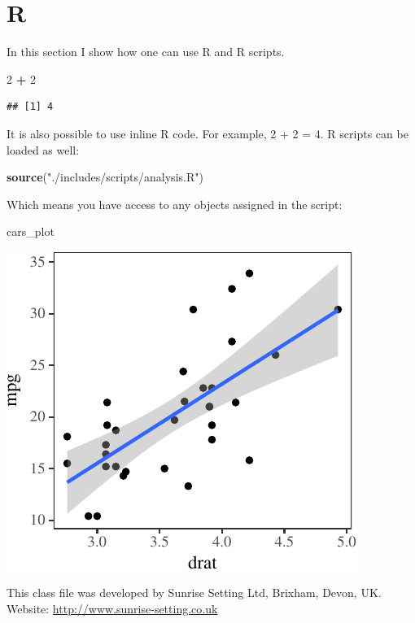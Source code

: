 \documentclass[Afour,sageh,times]{includes/tex/sagej}
\newenvironment{Shaded}{\begin{snugshade}}{\end{snugshade}}
\newcommand{\KeywordTok}[1]{\textcolor[rgb]{0.13,0.29,0.53}{\textbf{#1}}}
\newcommand{\DecValTok}[1]{\textcolor[rgb]{0.00,0.00,0.81}{#1}}
\newcommand{\StringTok}[1]{\textcolor[rgb]{0.31,0.60,0.02}{#1}}
\newcommand{\OperatorTok}[1]{\textcolor[rgb]{0.81,0.36,0.00}{\textbf{#1}}}
\newcommand{\NormalTok}[1]{#1}
\begin{document}
\section{R}

In this section I show how one can use R and R scripts.

\begin{Shaded}
\begin{Highlighting}[]
\DecValTok{2} \OperatorTok{+}\StringTok{ }\DecValTok{2}
\end{Highlighting}
\end{Shaded}

\begin{verbatim}
## [1] 4
\end{verbatim}

\noindent It is also possible to use inline R code. For example, 2 + 2 =
4. R scripts can be loaded as well:

\begin{Shaded}
\begin{Highlighting}[]
\KeywordTok{source}\NormalTok{(}\StringTok{"./includes/scripts/analysis.R"}\NormalTok{)}
\end{Highlighting}
\end{Shaded}

\noindent Which means you have access to any objects assigned in the
script:

\begin{Shaded}
\begin{Highlighting}[]
\NormalTok{cars_plot}
\end{Highlighting}
\end{Shaded}

\begin{flushleft}\includegraphics{./includes/figs/ex_plot-1} \end{flushleft}

\begin{acks}
This class file was developed by Sunrise Setting Ltd, Brixham, Devon, UK. \\
Website: \url{http://www.sunrise-setting.co.uk}
\end{acks}


\end{document}

